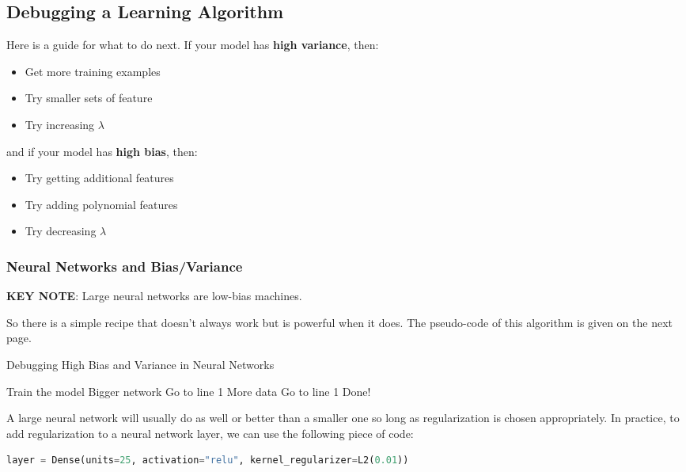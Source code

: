 \documentclass[a4paper, 12pt]{book}
\begin{document}
\subsection{Debugging a Learning Algorithm}
Here is a guide for what to do next. If your model has \textbf{high variance}, then:
\begin{itemize}
    \item Get more training examples
    \item Try smaller sets of feature
    \item Try increasing $\lambda$
\end{itemize}
and if your model has \textbf{high bias}, then:
\begin{itemize}
    \item Try getting additional features
    \item Try adding polynomial features
    \item Try decreasing $\lambda$
\end{itemize}

\subsubsection{Neural Networks and Bias/Variance}
\textbf{KEY NOTE}: Large neural networks are low-bias machines.

\noindent So there is a simple recipe that doesn't always work but is powerful when it does. The pseudo-code of this algorithm is given on the next page.
\newpage
\begin{algorithm}
\caption{Debugging High Bias and Variance in Neural Networks}
\begin{algorithmic} [1]
\State Train the model
    \State Bigger network
    \State Go to line 1
\EndIf
{}
    \State More data
    \State Go to line 1
\Else
    \State Done!
\EndIf
\end{algorithmic}
\end{algorithm}
A large neural network will usually do as well or better than a smaller one so long as regularization is chosen appropriately. In practice, to add regularization to a neural network layer, we can use the following piece of code:
\begin{lstlisting}[language=Python, caption={neural network regularization}]
layer = Dense(units=25, activation="relu", kernel_regularizer=L2(0.01))
\end{lstlisting}
\end{document}
